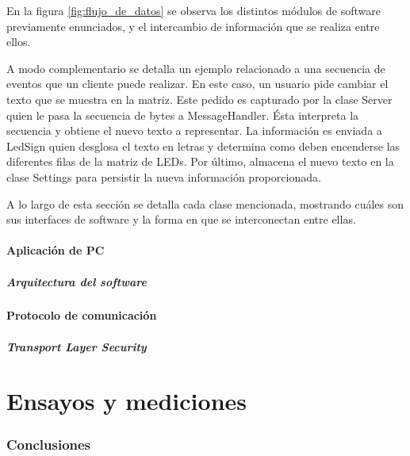 En la figura \ref{fig:flujo_de_datos} se observa los distintos módulos de software previamente enunciados, y el intercambio de información que se realiza entre ellos.


A modo complementario se detalla un ejemplo relacionado a una secuencia de eventos que un cliente puede realizar.
En este caso, un usuario pide cambiar el texto que se muestra en la matriz. Este pedido es capturado por la clase Server quien le pasa la secuencia de bytes a MessageHandler.
Ésta interpreta la secuencia y obtiene el nuevo texto a representar. La información es enviada a LedSign quien desglosa el texto en letras y determina como deben encenderse las diferentes filas de la matriz de LEDs.
Por último, almacena el nuevo texto en la clase Settings para persistir la nueva información proporcionada.

A lo largo de esta sección se detalla cada clase mencionada, mostrando cuáles son sus interfaces de software y la forma en que se interconectan entre ellas.




\subsection{Aplicación de PC}
\subsubsection{Arquitectura del software}
\subsection{Protocolo de comunicación}\label{sec:protocolo}
\subsubsection{Transport Layer Security}


\clearpage
\part{Ensayos y mediciones}\label{part:ensayos}
\section{Conclusiones}
